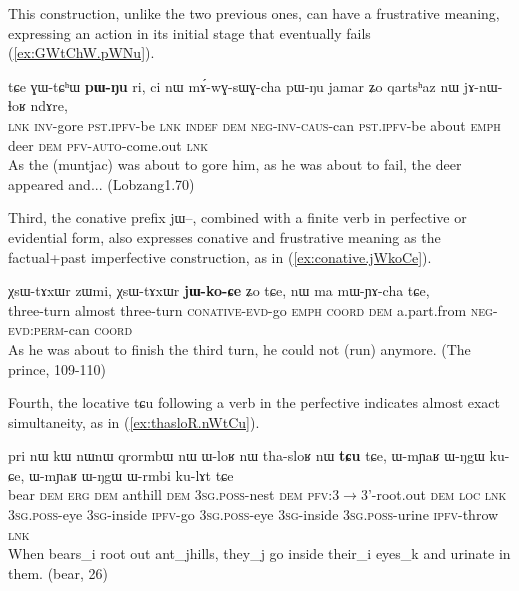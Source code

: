 \documentclass[oldfontcommands,oneside,a4paper,11pt]{article}
\newcommand{\ipa}[1]{{\phon \mbox{#1}}} %
\newcommand{\refb}[1]{(\ref{#1})}
\begin{document}
This construction, unlike the two previous ones, can have a frustrative meaning, expressing an action in its initial stage that eventually fails \refb{ex:GWtChW.pWNu}.

     \begin{exe}
\ex \label{ex:GWtChW.pWNu}
\gll
\ipa{tɕe}  	\ipa{ɣɯ-tɕʰɯ}  	\ipa{\textbf{pɯ-ŋu}}  	\ipa{ri,}  	\ipa{ci}  	\ipa{nɯ}  	\ipa{mɤ́-wɣ-sɯɣ-cha}  	\ipa{pɯ-ŋu}  	\ipa{jamar}  	\ipa{ʑo}  	\ipa{qartsʰaz}  	\ipa{nɯ}  	\ipa{jɤ-nɯ-ɬoʁ}  	\ipa{ndɤre,}  \\
\textsc{lnk} \textsc{inv}-gore \textsc{pst.ipfv}-be \textsc{lnk} \textsc{indef} \textsc{dem} \textsc{neg-inv-caus}-can  \textsc{pst.ipfv}-be about \textsc{emph} deer \textsc{dem} \textsc{pfv-auto}-come.out \textsc{lnk} \\
\glt As the (muntjac) was about to gore him, as he was about to fail, the deer appeared and... (Lobzang1.70)
 \end{exe}

Third, the conative prefix \ipa{jɯ}--, combined with a finite verb  in perfective or evidential form, also expresses conative and frustrative meaning  as the factual+past imperfective construction, as in \refb{ex:conative.jWkoCe}.

\begin{exe}
\ex \label{ex:conative.jWkoCe}
\gll 
\ipa{χsɯ-tɤxɯr}   	\ipa{zɯmi,}   	\ipa{χsɯ-tɤxɯr}   	\ipa{\textbf{jɯ-ko-ɕe}}   	\ipa{ʑo}   	   	\ipa{tɕe,}   	\ipa{nɯ}   	\ipa{ma}   	\ipa{mɯ-ɲɤ-cha}   	\ipa{tɕe,}   \\
three-turn almost three-turn \textsc{conative-evd}-go \textsc{emph} \textsc{coord} \textsc{dem} a.part.from \textsc{neg-evd:perm}-can \textsc{coord} \\
\glt As he was about to finish the third turn, he could not (run) anymore. (The prince, 109-110)
\end{exe}


Fourth, the locative \ipa{tɕu} following a verb in the perfective indicates  almost exact simultaneity, as in \refb{ex:thasloR.nWtCu}.  

\begin{exe}
\ex \label{ex:thasloR.nWtCu}
\gll
\ipa{pri}   	\ipa{nɯ}   	\ipa{kɯ}   	\ipa{nɯnɯ}   	\ipa{qrormbɯ}   	\ipa{nɯ}   	\ipa{ɯ-loʁ}   	\ipa{nɯ}   	\ipa{tha-sloʁ}   	\ipa{nɯ}   	\ipa{\textbf{tɕu}}   	\ipa{tɕe,}   	  	\ipa{ɯ-mɲaʁ}   	\ipa{ɯ-ŋgɯ}   	\ipa{ku-ɕe,}   	\ipa{ɯ-mɲaʁ}   	\ipa{ɯ-ŋgɯ}   	\ipa{ɯ-rmbi}   	\ipa{ku-lɤt}   	\ipa{tɕe}   	\\
bear \textsc{dem} \textsc{erg} \textsc{dem} anthill \textsc{dem} \textsc{3sg.poss}-nest \textsc{dem} \textsc{pfv}:3$\rightarrow$3'-root.out \textsc{dem} \textsc{loc} \textsc{lnk} \textsc{3sg.poss}-eye \textsc{3sg}-inside \textsc{ipfv}-go \textsc{3sg.poss}-eye \textsc{3sg}-inside \textsc{3sg.poss}-urine \textsc{ipfv}-throw \textsc{lnk} \\
\glt When bears_i root out ant_jhills, they_j go inside their_i eyes_k and urinate in them.
(bear, 26)
\end{exe}
\end{document}
